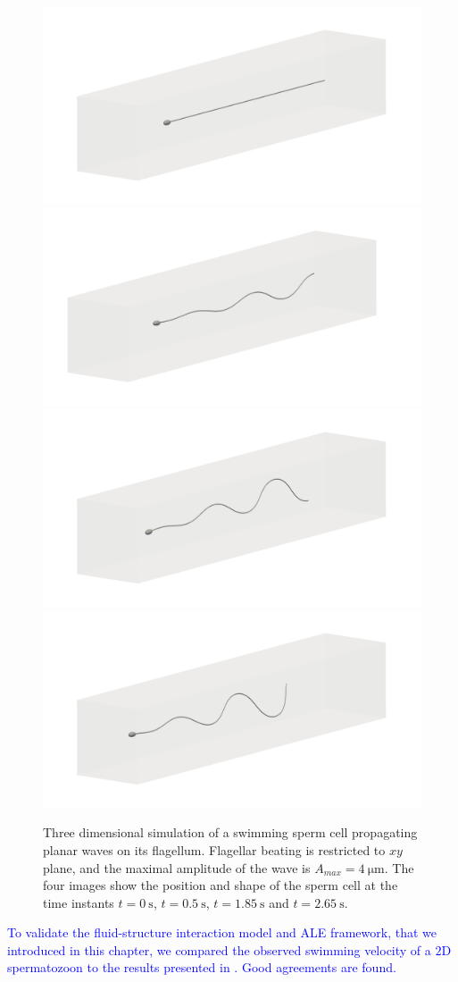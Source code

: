 \documentclass[graybox]{svmult}
\newcommand{\review}[1]{\textcolor{blue}{#1}}
\begin{document}
\begin{figure}
	\centering
	\includegraphics[width=0.45\linewidth]{Figures/3d_sperm_planar/3dswimmer_00.png}
	\includegraphics[width=0.45\linewidth]{Figures/3d_sperm_planar/3dswimmer_0dot5.png}
	\includegraphics[width=0.45\linewidth]{Figures/3d_sperm_planar/3dswimmer_1dot85.png}
	\includegraphics[width=0.45\linewidth]{Figures/3d_sperm_planar/3dswimmer_2dot65.png}
	\caption{Three dimensional simulation of a swimming sperm cell propagating planar waves on its flagellum. Flagellar beating is restricted to $xy$ plane, and the maximal amplitude of the wave is $A_{max}=\SI{4}{\micro\meter}$. The four images show the position and shape of the sperm cell at the time instants $t=\SI{0}{\second}$, $t=\SI{0.5}{\second}$, $t=\SI{1.85}{\second}$ and $t=\SI{2.65}{\second}$. }
	\label{Fig:3dsperm_planar}
\end{figure}

\review{ 
To validate the fluid-structure interaction model and ALE framework, that we introduced in this chapter, we compared the observed swimming velocity of a $2$D spermatozoon to the results presented in \cite{RazaviAhmadi2015}. Good agreements are found. }
\end{document}

